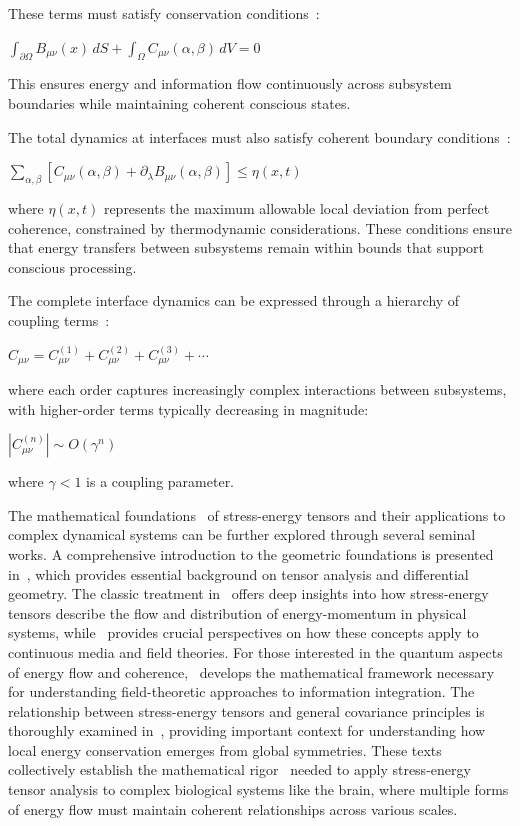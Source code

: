These terms must satisfy conservation conditions~:

$\int_{\partial\Omega} B_{\mu\nu}(x)\,dS + \int_\Omega C_{\mu\nu}(\alpha,\beta)\,dV = 0$

This ensures energy and information flow continuously across subsystem boundaries while maintaining coherent conscious states.

The total dynamics at interfaces must also satisfy coherent boundary conditions~:

$\sum_{\alpha,\beta} [C_{\mu\nu}(\alpha,\beta) + \partial_\lambda B_{\mu\nu}(\alpha,\beta)] \leq \eta(x,t)$

where $\eta (x,t)$ represents the maximum allowable local deviation from perfect coherence, constrained by thermodynamic considerations. These conditions ensure that energy transfers between subsystems remain within bounds that support conscious processing.

The complete interface dynamics can be expressed through a hierarchy of coupling terms~:

$C_{\mu\nu} = C^{(1)}_{\mu\nu} + C^{(2)}_{\mu\nu} + C^{(3)}_{\mu\nu} + \cdots$

where each order captures increasingly complex interactions between subsystems, with higher-order terms typically decreasing in magnitude:

$|C^{(n)}_{\mu\nu}| \sim O(\gamma^n)$

where $\gamma < 1$ is a coupling parameter.

The mathematical foundations~ of stress-energy tensors and their applications to complex dynamical systems can be further explored through several seminal works. A comprehensive introduction to the geometric foundations is presented in~\cite{frankel2011}, which provides essential background on tensor analysis and differential geometry. The classic treatment in~\cite{Misner1973} offers deep insights into how stress-energy tensors describe the flow and distribution of energy-momentum in physical systems, while~\cite{Landau1987} provides crucial perspectives on how these concepts apply to continuous media and field theories. For those interested in the quantum aspects of energy flow and coherence,~\cite{Peskin1995} develops the mathematical framework necessary for understanding field-theoretic approaches to information integration. The relationship between stress-energy tensors and general covariance principles is thoroughly examined in~\cite{Wald1984}, providing important context for understanding how local energy conservation emerges from global symmetries. These texts collectively establish the mathematical rigor~ needed to apply stress-energy tensor analysis to complex biological systems like the brain, where multiple forms of energy flow must maintain coherent relationships across various scales.

